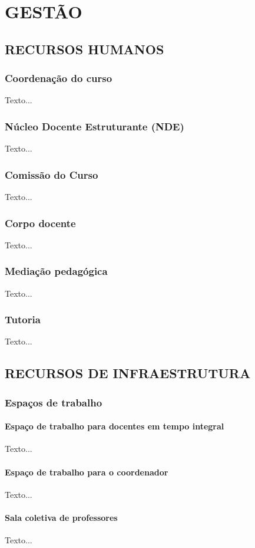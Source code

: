 
\chapter{GESTÃO}

\section{RECURSOS HUMANOS}
\subsection{Coordenação do curso}
Texto...
\subsection{Núcleo Docente Estruturante (NDE)}
Texto...
\subsection{Comissão do Curso}
Texto...
\subsection{Corpo docente}
Texto...
\subsection{Mediação pedagógica}
Texto...
\subsection{Tutoria}
Texto...

\section{RECURSOS DE INFRAESTRUTURA}
\subsection{Espaços de trabalho}
\subsubsection{Espaço de trabalho para docentes em tempo integral}
Texto...
\subsubsection{Espaço de trabalho para o coordenador}
Texto...
\subsubsection{Sala coletiva de professores}
Texto...

